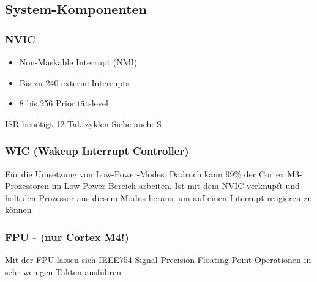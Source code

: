 \subsection{System-Komponenten}
\begin{multicols}{2}
    \begin{minipage}{\linewidth}
        \subsubsection{NVIC}
        \begin{itemize}
            \item Non-Maskable Interrupt (NMI)
            \item Bis zu 240 externe Interrupts
            \item 8 bis 256 Prioritätslevel
        \end{itemize}
        \rightarrow ISR benötigt 12 Taktzyklen\newline
        Siehe auch: S\pageref{NVIC}\\
    \end{minipage}

    \begin{minipage}{\linewidth}
        \subsubsection{WIC (Wakeup Interrupt Controller)}
        Für die Umsetzung von Low-Power-Modes.\newline
        Dadruch kann 99\% der Cortex M3-Prozessoren im Low-Power-Bereich arbeiten.
        \newline
        \newline
        Ist mit dem NVIC verknüpft und holt den Prozessor aus diesem Modus heraus, um auf einen Interrupt reagieren zu können\\
    \end{minipage}
    
    \begin{minipage}{\linewidth}
        \subsubsection{FPU - (nur Cortex M4!)}
        Mit der FPU lassen sich IEEE754 Signal Precision Floating-Point Operationen in sehr wenigen Takten ausführen\\
    \end{minipage}
    
    \begin{minipage}{\linewidth}

\end{minipage}
\end{multicols}
